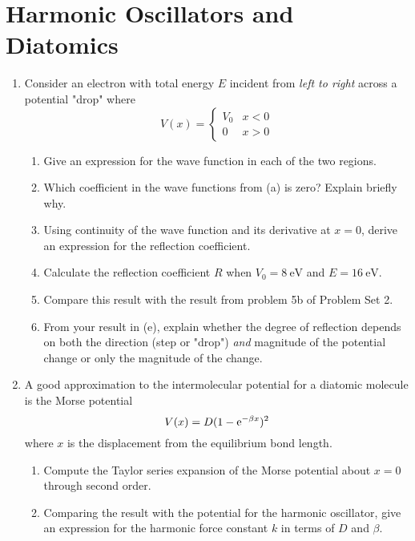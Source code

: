 \documentclass[../psets.tex]{subfiles}
\begin{document}
\section{Harmonic Oscillators and Diatomics}
\begin{enumerate}
    \item {}Consider an electron with total energy $E$ incident from \emph{left to right} across a potential "drop" where
    \begin{equation*}
        V(x) =
        \begin{cases}
            V_0 & x<0\\
            0   & x>0
        \end{cases}
    \end{equation*}
    \begin{enumerate}
        \item Give an expression for the wave function in each of the two regions.
        \item Which coefficient in the wave functions from (a) is zero? Explain briefly why.
        \item Using continuity of the wave function and its derivative at $x=0$, derive an expression for the reflection coefficient.
        \item Calculate the reflection coefficient $R$ when $V_0=\SI{8}{\electronvolt}$ and $E=\SI{16}{\electronvolt}$.
        \item Compare this result with the result from problem 5b of Problem Set 2.
        \item From your result in (e), explain whether the degree of reflection depends on both the direction (step or "drop") \emph{and} magnitude of the potential change or only the magnitude of the change.
    \end{enumerate}
    \item A good approximation to the intermolecular potential for a diatomic molecule is the Morse potential
    \begin{equation*}
        V(x) = D(1-\e[-\beta x])^2
    \end{equation*}
    where $x$ is the displacement from the equilibrium bond length.
    \begin{enumerate}
        \item Compute the Taylor series expansion of the Morse potential about $x=0$ through second order.
        \item Comparing the result with the potential for the harmonic oscillator, give an expression for the harmonic force constant $k$ in terms of $D$ and $\beta$.

\end{enumerate}
\end{enumerate}
\end{document}
